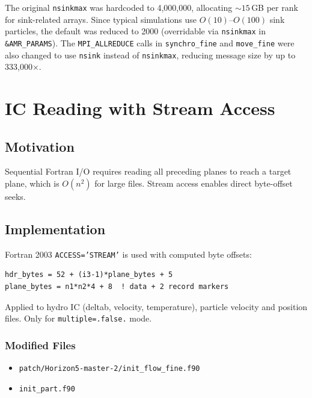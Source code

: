 \documentclass[11pt,fleqn]{book}
\begin{document}
The original \texttt{nsinkmax} was hardcoded to 4,000,000, allocating ${\sim}15$\,GB per rank for sink-related arrays. Since typical simulations use $O(10)$--$O(100)$ sink particles, the default was reduced to 2000 (overridable via \texttt{nsinkmax} in \texttt{\&AMR\_PARAMS}). The \texttt{MPI\_ALLREDUCE} calls in \texttt{synchro\_fine} and \texttt{move\_fine} were also changed to use \texttt{nsink} instead of \texttt{nsinkmax}, reducing message size by up to 333,000$\times$.


\chapter{IC Reading with Stream Access}

\section{Motivation}

Sequential Fortran I/O requires reading all preceding planes to reach a target plane, which is $O(n^2)$ for large files. Stream access enables direct byte-offset seeks.

\section{Implementation}

Fortran 2003 \texttt{ACCESS='STREAM'} is used with computed byte offsets:

\begin{lstlisting}[style=fortran,numbers=none]
hdr_bytes = 52 + (i3-1)*plane_bytes + 5
plane_bytes = n1*n2*4 + 8  ! data + 2 record markers
\end{lstlisting}

Applied to hydro IC (deltab, velocity, temperature), particle velocity and position files. Only for \texttt{multiple=.false.} mode.

\subsection{Modified Files}
\begin{itemize}[leftmargin=2em]
  \item \texttt{patch/Horizon5-master-2/init\_flow\_fine.f90}
  \item \texttt{init\_part.f90}
\end{itemize}
\end{document}
